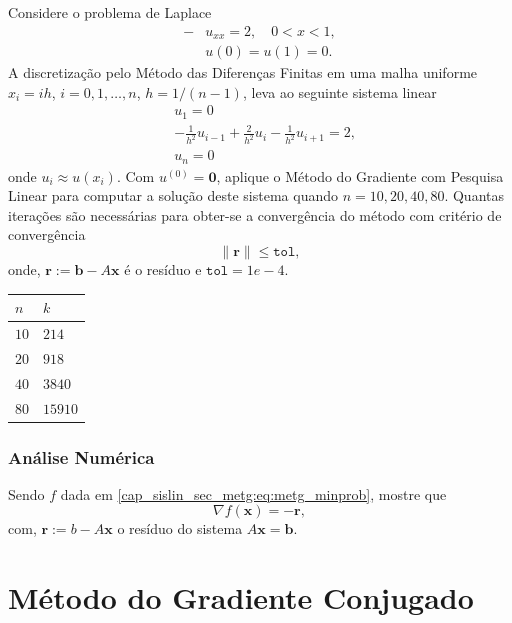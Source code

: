 \begin{exer}
  Considere o problema de Laplace
  \begin{align}
    -&u_{xx} = 2,\quad 0 < x < 1,\\
     &u(0) = u(1) = 0.
  \end{align}
  A discretização pelo Método das Diferenças Finitas em uma malha uniforme $x_i = ih$, $i=0,1,\dotsc,n$, $h=1/(n-1)$, leva ao seguinte sistema linear
  \begin{align}
    &u_1 = 0\\
    &-\frac{1}{h^2}u_{i-1} + \frac{2}{h^2}u_{i} - \frac{1}{h^2}u_{i+1} = 2,\\
    &u_n = 0
  \end{align}
  onde $u_i \approx u(x_i)$. Com $u^{(0)} = \pmb{0}$, aplique o Método do Gradiente com Pesquisa Linear para computar a solução deste sistema quando $n=10, 20, 40, 80$. Quantas iterações são necessárias para obter-se a convergência do método com critério de convergência
  \begin{equation}
    \|\pmb{r}\| \leq \texttt{tol},
  \end{equation}
  onde, $\pmb{r} := \pmb{b} - A\pmb{x}$ é o resíduo e $\texttt{tol} = 1e-4$.
\end{exer}
\begin{resp}
  \begin{tabular}{ll}
    $n$ & $k$\\\hline
    $10$ & $214$\\
    $20$ & $918$\\
    $40$ & $3840$\\
    $80$ & $15910$
  \end{tabular}
\end{resp}

\subsubsection{Análise Numérica}

\begin{exer}
  Sendo $f$ dada em \eqref{cap_sislin_sec_metg:eq:metg_minprob}, mostre que
  \begin{equation}
    \nabla f\left(\pmb{x}\right) = -\pmb{r},
  \end{equation}
  com, $\pmb{r} := b - A\pmb{x}$ o resíduo do sistema $A\pmb{x} = \pmb{b}$.
\end{exer}


\section{Método do Gradiente Conjugado}\label{cap_sislin_sec_metgc}

